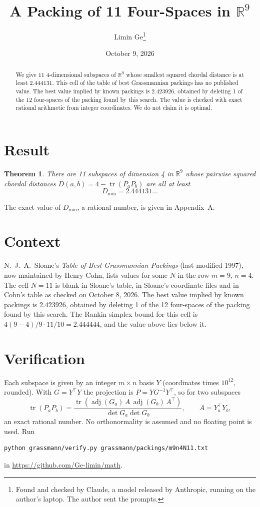 \documentclass[11pt,a4paper]{article}
\title{A Packing of 11 Four-Spaces in $\mathbb{R}^{9}$}
\author{Limin Ge\thanks{Found and checked by Claude, a model released by Anthropic, running on the author's laptop. The author sent the prompts.}}
\date{October 9, 2026}
\newtheorem*{theorem}{Theorem}
\begin{document}
\maketitle
\begin{abstract}
We give 11 4-dimensional subspaces of $\mathbb{R}^{9}$ whose smallest squared chordal distance is at least 2.444131. This cell of the table of best Grassmannian packings has no published value. The best value implied by known packings is 2.423926, obtained by deleting 1 of the 12 four-spaces of the packing found by this search. The value is checked with exact rational arithmetic from integer coordinates. We do not claim it is optimal.
\end{abstract}

\section{Result}
\begin{theorem}
There are 11 subspaces of dimension 4 in $\mathbb{R}^{9}$ whose pairwise squared chordal distances $D(a,b) = 4 - \operatorname{tr}(P_aP_b)$ are all at least
\[ D_{\min} = 2.444131\ldots \]
\end{theorem}
The exact value of $D_{\min}$, a rational number, is given in Appendix~A.


\section{Context}
N.~J.~A.~Sloane's \emph{Table of Best Grassmannian Packings} (last modified 1997), now maintained by Henry Cohn, lists values for some $N$ in the row $m=9$, $n=4$. The cell $N=11$ is blank in Sloane's table, in Sloane's coordinate files and in Cohn's table as checked on October 8, 2026. The best value implied by known packings is 2.423926, obtained by deleting 1 of the 12 four-spaces of the packing found by this search. The Rankin simplex bound for this cell is $4(9-4)/9\cdot 11/10 = 2.444444$, and the value above lies below it.


\section{Verification}
Each subspace is given by an integer $m\times n$ basis $Y$ (coordinates times $10^{12}$, rounded). With $G=Y^\top Y$ the projection is $P=YG^{-1}Y^\top$, so for two subspaces
\[ \operatorname{tr}(P_aP_b)=\frac{\operatorname{tr}(\operatorname{adj}(G_a)\,A\,\operatorname{adj}(G_b)\,A^\top)}{\det G_a\det G_b},\qquad A=Y_a^\top Y_b, \]
an exact rational number. No orthonormality is assumed and no floating point is used. Run
\begin{verbatim}
python grassmann/verify.py grassmann/packings/m9n4N11.txt
\end{verbatim}
in \url{https://github.com/Ge-limin/math}.
\end{document}
